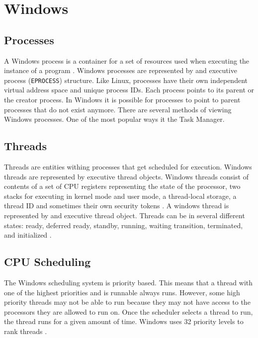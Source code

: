 \section{Windows}
\subsection{Processes}
\noindent
A Windows process is a container for a set of resources used when executing the instance of a program \cite{WindowsText}. 
Windows processes are represented by and executive process (\lstinline{EPROCESS}) structure.  Like Linux, processes have their own independent virtual address space and unique process IDs. Each process points to its parent or the creator process. In Windows it is possible for processes to point to parent processes that do not exist anymore. There are several methods of viewing Windows processes. One of the most popular ways it the Task Manager.    

\subsection{Threads}
\noindent
Threads are entities withing processes that get scheduled for execution. Windows threads are represented by executive thread objects. Windows threads consist of contents of a set of CPU registers representing the state of the processor, two stacks for executing in kernel mode and user mode, a thread-local storage, a thread ID and sometimes their own security tokens \cite{WindowsText}. A windows thread is represented by and executive thread object. Threads can be in several different states: ready, deferred ready, standby, running, waiting transition, terminated, and initialized \cite{WindowsText}.

\subsection{CPU Scheduling} %
\noindent
The Windows scheduling system is priority based. This means that a thread with one of the highest priorities and is runnable always runs. However, some high priority threads may not be able to run because they may not have access to the processors they are allowed to run on. Once the scheduler selects a thread to run, the thread runs for a given amount of time. Windows uses 32 priority levels to rank threads \cite{WindowsText}.

